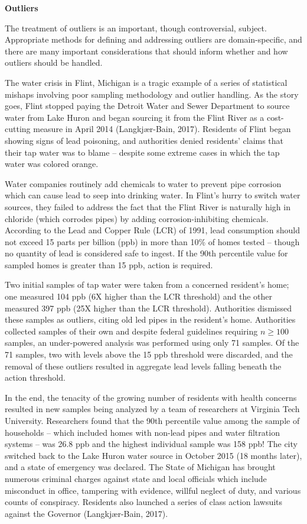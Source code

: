 \documentclass[
]{book}
\begin{document}
\textbf{Outliers}

The treatment of outliers is an important, though controversial, subject. Appropriate methods for defining and addressing outliers are domain-specific, and there are many important considerations that should inform whether and how outliers should be handled.

The water crisis in Flint, Michigan is a tragic example of a series of statistical mishaps involving poor sampling methodology and outlier handling. As the story goes, Flint stopped paying the Detroit Water and Sewer Department to source water from Lake Huron and began sourcing it from the Flint River as a cost-cutting measure in April 2014 (Langkjær-Bain, 2017). Residents of Flint began showing signs of lead poisoning, and authorities denied residents' claims that their tap water was to blame -- despite some extreme cases in which the tap water was colored orange.

Water companies routinely add chemicals to water to prevent pipe corrosion which can cause lead to seep into drinking water. In Flint's hurry to switch water sources, they failed to address the fact that the Flint River is naturally high in chloride (which corrodes pipes) by adding corrosion-inhibiting chemicals. According to the Lead and Copper Rule (LCR) of 1991, lead consumption should not exceed 15 parts per billion (ppb) in more than 10\% of homes tested -- though no quantity of lead is considered safe to ingest. If the 90th percentile value for sampled homes is greater than 15 ppb, action is required.

Two initial samples of tap water were taken from a concerned resident's home; one measured 104 ppb (6X higher than the LCR threshold) and the other measured 397 ppb (25X higher than the LCR threshold). Authorities dismissed these samples as outliers, citing old led pipes in the resident's home. Authorities collected samples of their own and despite federal guidelines requiring \(n \ge 100\) samples, an under-powered analysis was performed using only 71 samples. Of the 71 samples, two with levels above the 15 ppb threshold were discarded, and the removal of these outliers resulted in aggregate lead levels falling beneath the action threshold.

In the end, the tenacity of the growing number of residents with health concerns resulted in new samples being analyzed by a team of researchers at Virginia Tech University. Researchers found that the 90th percentile value among the sample of households -- which included homes with non-lead pipes and water filtration systems -- was 26.8 ppb and the highest individual sample was 158 ppb! The city switched back to the Lake Huron water source in October 2015 (18 months later), and a state of emergency was declared. The State of Michigan has brought numerous criminal charges against state and local officials which include misconduct in office, tampering with evidence, willful neglect of duty, and various counts of conspiracy. Residents also launched a series of class action lawsuits against the Governor (Langkjær-Bain, 2017).
\end{document}

